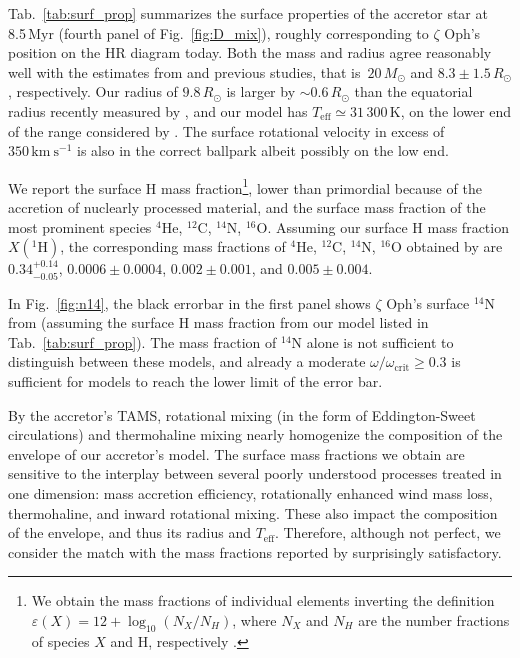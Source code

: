 \documentclass[twocolumn,twocolappendix,trackchanges]{aastex63}
\newcommand{\kms}{{\mathrm{km\ s^{-1}}}}
\DeclareRobustCommand{\Figref}[1]{Fig.~\ref{#1}}
\DeclareRobustCommand{\Tabref}[1]{Tab.~\ref{#1}}
\newcommand{\zoph}{$\zeta$ Oph}
\begin{document}
\Tabref{tab:surf_prop} summarizes the surface properties of the
accretor star at 8.5\,Myr (fourth panel of \Figref{fig:D_mix}),
roughly corresponding to \zoph's position on the HR diagram
today. Both the mass and radius agree reasonably well with the
estimates from  and previous studies, that
is~$20\,M_\odot$ and $8.3\pm1.5\,R_\odot$, respectively. Our radius of
$9.8\,R_\odot$ is larger by $\sim0.6\,R_\odot$ than the equatorial
radius recently measured by \cite{gordon:18}, and our model has
$T_\mathrm{eff}\simeq31\,300$\,K, on the lower end of the range
considered by . The surface
rotational velocity in excess of $350\,\kms$ is also in the correct
ballpark albeit possibly on the low end.

We report the surface H mass fraction\footnote{We obtain the mass
  fractions of individual elements inverting the definition
  $\varepsilon(X)=12+\log_{10}(N_X/N_H)$, where $N_X$ and $N_H$ are
  the number fractions of species $X$ and H, respectively
  \citep[e.g.,][]{lodders:19}.}, lower than primordial because of the
accretion of nuclearly processed material, and the surface mass
fraction of the most prominent species $^4\mathrm{He}$,
$^{12}\mathrm{C}$, $^{14}\mathrm{N}$, $^{16}\mathrm{O}$.  Assuming our
surface H mass fraction $X(^1\mathrm{H})$, the corresponding mass
fractions of $^4\mathrm{He}$, $^{12}\mathrm{C}$, $^{14}\mathrm{N}$,
$^{16}\mathrm{O}$ obtained by  are
$0.34^{+0.14}_{-0.05}$, $0.0006\pm0.0004$, $0.002\pm0.001$, and
$0.005\pm0.004$.

In \Figref{fig:n14}, the black errorbar in the first panel shows
\zoph's surface $^{14}\mathrm{N}$ from 
(assuming the surface H mass fraction from our model listed in
\Tabref{tab:surf_prop}). The mass fraction of $^{14}\mathrm{N}$ alone
is not sufficient to distinguish between these models, and already a
moderate $\omega/\omega_\mathrm{crit}\geq0.3$ is sufficient for models
to reach the lower limit of the error bar.


By the accretor's TAMS, rotational mixing (in the
form of Eddington-Sweet circulations) and thermohaline mixing nearly
homogenize the composition of the envelope of our accretor's
model. The surface mass fractions we obtain are sensitive to the
interplay between several poorly understood processes treated in one
dimension: mass accretion efficiency, rotationally enhanced wind mass
loss, thermohaline, and inward rotational mixing. These also impact
the composition of the envelope, and thus its radius and
$T_\mathrm{eff}$. Therefore, although not perfect, we consider the
match with the mass fractions reported by 
surprisingly satisfactory.
\end{document}

